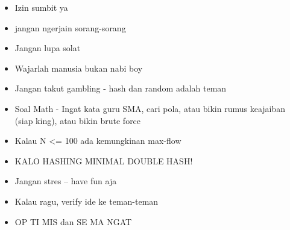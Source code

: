 \begin{itemize}
    \item Izin sumbit ya
    \item jangan ngerjain sorang-sorang
    \item Jangan lupa solat
    \item Wajarlah manusia bukan nabi boy
    \item Jangan takut gambling - hash dan random adalah teman
    \item Soal Math - Ingat kata guru SMA, cari pola, atau bikin rumus keajaiban (siap king), atau bikin brute force
    \item Kalau N <= 100 ada kemungkinan max-flow
    \item KALO HASHING MINIMAL DOUBLE HASH!
    \item Jangan stres -- have fun aja
    \item Kalau ragu, verify ide ke teman-teman
    \item OP TI MIS dan SE MA NGAT
\end{itemize}